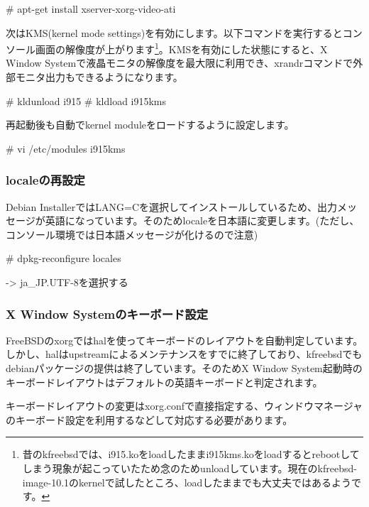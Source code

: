 \documentclass[mingoth,a4paper]{jsarticle}
\begin{document}
\begin{commandline}
# apt-get install xserver-xorg-video-ati
\end{commandline}

次はKMS(kernel mode settings)を有効にします。以下コマンドを実行するとコンソール画面の解像度が上がります\footnote{昔のkfreebsdでは、i915.koをloadしたままi915kms.koをloadするとrebootしてしまう現象が起こっていたため念のためunloadしています。現在のkfreebsd-image-10.1のkernelで試したところ、loadしたままでも大丈夫ではあるようです。}。KMSを有効にした状態にすると、X Window Systemで液晶モニタの解像度を最大限に利用でき、xrandrコマンドで外部モニタ出力もできるようになります。

\begin{commandline}
  # kldunload i915
  # kldload i915kms
\end{commandline}

再起動後も自動でkernel moduleをロードするように設定します。

\begin{commandline}
  # vi /etc/modules
  i915kms
\end{commandline}

\subsubsection{localeの再設定}

Debian InstallerではLANG=Cを選択してインストールしているため、出力メッセージが英語になっています。そのためlocaleを日本語に変更します。(ただし、コンソール環境では日本語メッセージが化けるので注意)

\begin{commandline}
  # dpkg-reconfigure locales

  -> ja_JP.UTF-8を選択する
\end{commandline}

\subsubsection{X Window Systemのキーボード設定}

FreeBSDのxorgではhalを使ってキーボードのレイアウトを自動判定しています。しかし、halはupstreamによるメンテナンスをすでに終了しており、kfreebsdでもdebianパッケージの提供は終了しています。そのためX Window System起動時のキーボードレイアウトはデフォルトの英語キーボードと判定されます。

キーボードレイアウトの変更はxorg.confで直接指定する、ウィンドウマネージャのキーボード設定を利用するなどして対応する必要があります。
\end{document}
